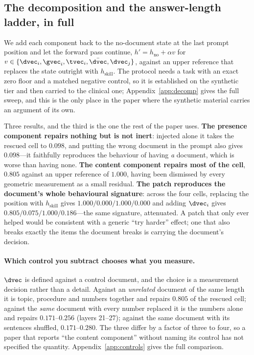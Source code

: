 \subsection{The decomposition and the answer-length ladder, in full}
\label{app:onepos}

We add each component back to the no-document state at the last prompt position
and let the forward pass continue, $h' = h_{\text{no}} + \alpha v$ for
$v \in \{\dvec_i, \gvec_i, \tvec_i, \bar{\dvec}, \dvec_j\}$, against an upper
reference that replaces the state outright with $h_{\text{skill}}$. The
protocol needs a task with an exact zero floor and a matched negative control,
so it is established on the synthetic tier and then carried to the clinical one;
Appendix~\ref{app:decomp} gives the full sweep, and this is the only place in
the paper where the synthetic material carries an argument of its own.

Three results, and the third is the one the rest of the paper uses.
\textbf{The presence component repairs nothing but is not inert}: injected
alone it takes the rescued cell to $0.098$, and putting the wrong document in
the prompt also gives $0.098$---it faithfully reproduces the behaviour of having
\emph{a} document, which is worse than having none. \textbf{The content
component repairs most of the cell}, $0.805$ against an upper reference of
$1.000$, having been dismissed by every geometric measurement as a small
residual. \textbf{The patch reproduces the document's whole behavioural
signature}: across the four cells, replacing the position with
$h_{\text{skill}}$ gives $1.000 / 0.000 / 1.000 / 0.000$ and adding $\dvec_i$
gives $0.805 / 0.075 / 1.000 / 0.186$---the same signature, attenuated. A patch
that only ever helped would be consistent with a generic ``try harder'' effect;
one that also breaks exactly the items the document breaks is carrying the
document's decision.

\paragraph{Which control you subtract chooses what you measure.} $\dvec$ is
defined against a control document, and the choice is a measurement decision
rather than a detail. Against an \emph{unrelated} document of the same length it
is topic, procedure and numbers together and repairs $0.805$ of the rescued
cell; against the \emph{same} document with every number replaced it is the
numbers alone and repairs $0.171$--$0.256$ (layers 21--27); against the same
document with its sentences shuffled, $0.171$--$0.280$. The three differ by a
factor of three to four, so a paper
that reports ``the content component'' without naming its control has not
specified the quantity. Appendix~\ref{app:controls} gives the full comparison.
